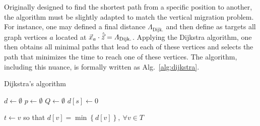 Originally designed to find the shortest path from a specific position to another, the algorithm must be slightly adapted to match the vertical migration problem.
For instance, one may defined a final distance $\varLambda_{\mathrm{Dijk.}}$ and then define as targets all graph vertices $a$ located at $\vec{x}_a \cdot \hat{\vec{z}} = \varLambda_{\mathrm{Dijk.}}$.
Applying the Dijkstra algorithm, one then obtains all minimal paths that lead to each of these vertices and selects the path that minimizes the time to reach one of these vertices.
The algorithm, including this nuance, is formally written as Alg.~\ref{alg:dijkstra}.
\newcommand{\forcond}{$i=0$ \KwTo $n$}
\begin{algorithm}[hbt!]
	\caption{Dijkstra's algorithm \citep{dijkstra1959note}}\label{alg:dijkstra}
	
	$d \gets \emptyset$ 
	$p \gets \emptyset$ 
	$Q \gets \emptyset$ 
	$d[s] \gets 0$\;
	
	$t \gets v$ so that $d[v] = \min \left\{ d[v] \right\}, ~ \forall v \in T$\;
\end{algorithm}

